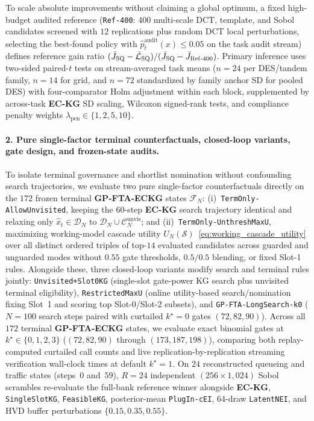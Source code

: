 To scale absolute improvements without claiming a global optimum, a fixed high-budget audited reference (\texttt{Ref-400}: $400$ multi-scale DCT, template, and Sobol candidates screened with $12$ replications plus random DCT local perturbations, selecting the best-found policy with $\hat{p}_t^{\mathrm{audit}}(x) \le 0.05$ on the task audit stream) defines reference gain ratio $(\bar{J}_{\mathrm{SQ}} - \bar{\mathcal{L}}_{\mathrm{SQ}})/(\bar{J}_{\mathrm{SQ}} - \bar{J}_{\mathrm{Ref\text{-}400}})$. Primary inference uses two-sided paired-$t$ tests on stream-averaged task means ($n=24$ per DES/tandem family, $n=14$ for grid, and $n=72$ standardized by family anchor SD for pooled DES) with four-comparator Holm adjustment within each block, supplemented by across-task \textbf{EC-KG} SD scaling, Wilcoxon signed-rank tests, and compliance penalty weights $\lambda_{\mathrm{pen}} \in \{1, 2, 5, 10\}$.

\paragraph{2. Pure single-factor terminal counterfactuals, closed-loop variants, gate design, and frozen-state audits.}
To isolate terminal governance and shortlist nomination without confounding search trajectories, we evaluate two pure single-factor counterfactuals directly on the $172$ frozen terminal \textbf{GP-FTA-ECKG} states $\mathcal{F}_N$: (i)~\texttt{TermOnly-AllowUnvisited}, keeping the $60$-step \textbf{EC-KG} search trajectory identical and relaxing only $\hat{x}_t \in \mathcal{D}_N$ to $\mathcal{D}_N \cup \mathcal{C}_N^{\mathrm{unvis}}$; and (ii)~\texttt{TermOnly-UnthreshMaxU}, maximizing working-model cascade utility $U_N(\mathcal{S})$~\eqref{eq:working_cascade_utility} over all distinct ordered triples of top-$14$ evaluated candidates across guarded and unguarded modes without $0.55$ gate thresholds, $0.5/0.5$ blending, or fixed Slot-1 rules. Alongside these, three closed-loop variants modify search and terminal rules jointly: \texttt{Unvisited+Slot0KG} (single-slot gate-power KG search plus unvisited terminal eligibility), \texttt{RestrictedMaxU} (online utility-based search/nomination fixing Slot~1 and scoring top Slot-0/Slot-2 subsets), and \texttt{GP-FTA-LongSearch-k0} ($N=100$ search steps paired with curtailed $k^\star = 0$ gates $(72, 82, 90)$). Across all $172$ terminal \textbf{GP-FTA-ECKG} states, we evaluate exact binomial gates at $k^\star \in \{0, 1, 2, 3\}$ ($(72, 82, 90)$ through $(173, 187, 198)$), comparing both replay-computed curtailed call counts and live replication-by-replication streaming verification wall-clock times at default $k^\star=1$. On $24$ reconstructed queueing and traffic states (steps~$0$ and~$59$), $R=24$ independent $(256\times 1{,}024)$ Sobol scrambles re-evaluate the full-bank reference winner alongside \textbf{EC-KG}, \texttt{SingleSlotKG}, \texttt{FeasibleKG}, posterior-mean \texttt{PlugIn-cEI}, $64$-draw \texttt{LatentNEI}, and HVD buffer perturbations $\{0.15, 0.35, 0.55\}$.


